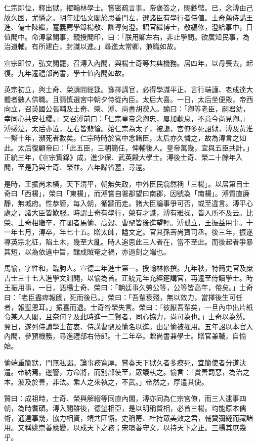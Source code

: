 \begin{pinyinscope}
仁宗即位，釋出獄，擢翰林學士。嘗密疏言事。帝褒答之，賜鈔幣。已，念溥由己故久困，尤憐之。明年建弘文閣於思善門左，選諸臣有學行者侍值。士奇薦侍講王進、儒士陳繼，蹇義薦學錄楊敬、訓導何澄。詔官繼博士，敬編修，澄給事中，日值閣中。命溥掌閣事，親授閣印，曰：「朕用卿左右，非止學問。欲廣知民事，為治道輔。有所建白，封識以進。」尋進太常卿，兼職如故。

宣宗即位，弘文閣罷，召溥入內閣，與楊士奇等共典機務。居四年，以母喪去，起復。九年遷禮部尚書，學士值內閣如故。

英宗初立，與士奇、榮請開經筵。豫擇講官，必得學識平正、言行端謹、老成達大體者數人供職。且請慎選宮中朝夕侍從內臣。太后大喜。一日，太后坐便殿，帝西向立，召英國公張輔及士奇、榮、溥、尚書胡濙入。諭曰：「卿等老臣，嗣君幼，幸同心共安社稷。」又召溥前曰：「仁宗皇帝念卿忠，屢加歎息，不意今尚見卿。」溥感泣，太后亦泣，左右皆悲愴。始仁宗為太子，被讒，宮僚多死詔獄，溥及黃淮一繫十年，瀕死者數矣。仁宗時時於宮中念諸臣，太后亦久憐之，故為溥言之如此。太后復顧帝曰：「此五臣，三朝簡任，俾輔後人。皇帝萬幾，宜與五臣共計。」正統三年，《宣宗實錄》成，進少保、武英殿大學士。溥後士奇、榮二十餘年入閣，至是乃與士奇、榮並。六年歸省墓，尋還。

是時，王振尚未橫，天下清平，朝無失政，中外臣民翕然稱「三楊」。以居第目士奇曰「西楊」，榮曰「東楊」，而溥嘗自署郡望曰南郡，因號為「南楊」。溥質直廉靜，無城府。性恭謹，每入朝，循牆而走。諸大臣論事爭可否，或至違言。溥平心處之，諸大臣皆歎服。時謂士奇有學行，榮有才識，溥有雅操，皆人所不及云。比榮、士奇相繼卒，在閣者馬愉、高穀、曹鼐皆後進望輕。溥孤立，王振益用事。十一年七月，溥卒，年七十五。贈太師，謚文定。官其孫壽尚寶司丞。後三年，振遂導英宗北征，陷土木，幾至大亂。時人追思此三人者在，當不至此。而後起者爭暴其短，以為依違中旨，釀成賊奄之禍，亦過刻之端也。

馬愉，字性和，臨朐人。宣德二年進士第一。授翰林修撰。九年秋，特簡史官及庶吉士三十七人進學文淵閣，以愉為首。正統元年充經筵講官，再遷至侍讀學士。時王振用事，一日，語楊士奇、榮曰：「朝廷事久勞公等，公等皆高年，倦矣。」士奇曰：「老臣盡瘁報國，死而後已。」榮曰：「吾輩衰殘，無以效力，當擇後生可任者，報聖恩耳。」振喜而退。士奇咎榮失言。榮曰：「彼厭吾輩矣，一旦內中出片紙令某人入閣，且奈何？及此時進一二賢者，同心協力，尚可為也。」士奇以為然。翼日，遂列侍讀學士苗衷、侍講曹鼐及愉名以進。由是愉被擢用。五年詔以本官入內閣，參預機務，尋進禮部右侍郎。十二年卒。贈尚書兼學士。贈官兼職，自愉始。

愉端重簡默，門無私謁。論事務寬厚。嘗奏天下獄久者多瘐死，宜簡使者分道決遣。帝納焉。邊警，方命將，而別部使至，眾議執之。愉言：「賞善罰惡，為治之本。波及於善，非法。乘人之來執之，不武。」帝然之，厚遣其使。

贊曰：成祖時，士奇、榮與解縉等同直內閣，溥亦同為仁宗宮僚，而三人逮事四朝，為時耆碩。溥入閣雖後，德望相亞，是以明稱賢相，必首三楊。均能原本儒術，通達事幾，協力相資，靖共匪懈。史稱房、杜持眾美效之君，輔贊彌縫而藏諸用。又稱姚崇善應變，以成天下之務；宋璟善守文，以持天下之正。三楊其庶幾乎。


\end{pinyinscope}